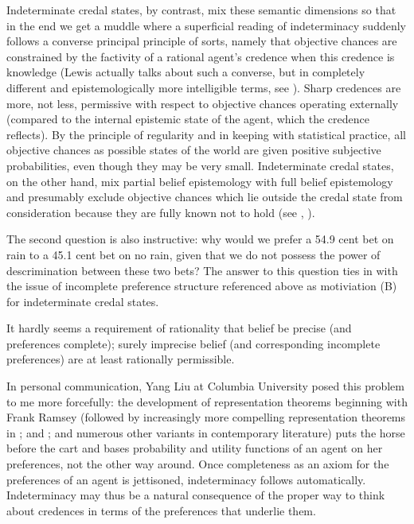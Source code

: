 Indeterminate credal states, by contrast, mix these
semantic dimensions so that in the end we get a muddle
where a superficial reading of indeterminacy suddenly
follows a converse principal principle of sorts, namely
that objective chances are constrained by the factivity
of a rational agent's credence when this credence is
knowledge (Lewis actually talks about such a converse,
but in completely different and epistemologically more
intelligible terms, see ). Sharp
credences are more, not less, permissive with respect
to objective chances operating externally (compared to
the internal epistemic state of the agent, which the
credence reflects). By the principle of regularity and
in keeping with statistical practice, all objective
chances as possible states of the world are given
positive subjective probabilities, even though they may
be very small. Indeterminate credal states, on the
other hand, mix partial belief epistemology with full
belief epistemology and presumably exclude objective
chances which lie outside the credal state from
consideration because they are fully known not to hold
(see , ).

The second question is also instructive: why would we
prefer a 54.9 cent bet on rain to a 45.1 cent bet on no
rain, given that we do not possess the power of
descrimination between these two bets? The answer to
this question ties in with the issue of incomplete
preference structure referenced above as motiviation
(B) for indeterminate credal states.

\begin{quotex}
  It hardly seems a requirement of rationality that
  belief be precise (and preferences complete); surely
  imprecise belief (and corresponding incomplete
  preferences) are at least rationally permissible.
\end{quotex}

In personal communication, Yang Liu at Columbia
University posed this problem to me more forcefully:
the development of representation theorems beginning
with Frank Ramsey (followed by increasingly more
compelling representation theorems in
; and ; and
numerous other variants in contemporary literature)
puts the horse before the cart and bases probability
and utility functions of an agent on her preferences,
not the other way around. Once completeness as an axiom
for the preferences of an agent is jettisoned,
indeterminacy follows automatically. Indeterminacy may
thus be a natural consequence of the proper way to
think about credences in terms of the preferences that
underlie them.

